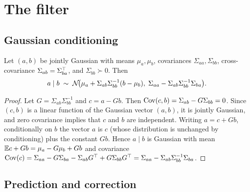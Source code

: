 \documentclass[11pt,a4paper]{article}
\begin{document}
\section{The filter}

\subsection{Gaussian conditioning}

\begin{lemma}\label{lem:conditioning}
Let $(a,b)$ be jointly Gaussian with means $\mu_a,\mu_b$, covariances
$\Sigma_{aa},\Sigma_{bb}$, cross-covariance $\Sigma_{ab}=\Sigma_{ba}^\top$, and
$\Sigma_{bb}\succ0$. Then
\[
  a\mid b \;\sim\; \mathcal{N}\!\big(\mu_a + \Sigma_{ab}\Sigma_{bb}^{-1}(b-\mu_b),\;
                         \Sigma_{aa}-\Sigma_{ab}\Sigma_{bb}^{-1}\Sigma_{ba}\big).
\]
\end{lemma}
\begin{proof}
Let $G=\Sigma_{ab}\Sigma_{bb}^{-1}$ and $c=a-Gb$. Then
$\operatorname{Cov}(c,b)=\Sigma_{ab}-G\Sigma_{bb}=0$. Since $(c,b)$ is a linear function of
the Gaussian vector $(a,b)$, it is jointly Gaussian, and zero covariance implies
that $c$ and $b$ are independent. Writing $a=c+Gb$, conditionally on $b$ the
vector $a$ is $c$ (whose distribution is unchanged by conditioning) plus the
constant $Gb$. Hence $a\mid b$ is Gaussian with mean
$\mathbb{E} c+Gb=\mu_a-G\mu_b+Gb$ and covariance
$\operatorname{Cov}(c)=\Sigma_{aa}-G\Sigma_{ba}-\Sigma_{ab}G^\top+G\Sigma_{bb}G^\top=\Sigma_{aa}-\Sigma_{ab}\Sigma_{bb}^{-1}\Sigma_{ba}$.
\end{proof}

\subsection{Prediction and correction}
\end{document}
